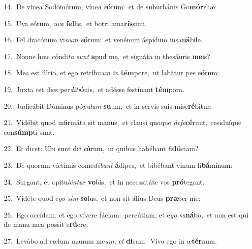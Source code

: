 {\numbfont\textcolor{\numbcolor}{14.}}~De vínea Sodomórum, víne\textit{a} \textit{e}\-\textbf{ó}rum:~\star et de suburbánis Go\-\textbf{mór}\-rhæ:\par
{\numbfont\textcolor{\numbcolor}{15.}}~Uva eórum, \textit{u}\-\textit{va} \textbf{fel}\-lis,~\star et botri ama\-\textbf{rís}\-simi.\par
{\numbfont\textcolor{\numbcolor}{16.}}~Fel dracónum vi\textit{num} \textit{e}\-\textbf{ó}rum:~\star et venénum áspidum insa\-\textbf{ná}\-bile.\par
{\numbfont\textcolor{\numbcolor}{17.}}~Nonne hæc cóndi\textit{ta} \textit{sunt} \textbf{a}\-pud me,~\star et signáta in thesáuris \textbf{me}\-is?\par
{\numbfont\textcolor{\numbcolor}{18.}}~Mea est últio, et ego retríbu\textit{am} \textit{in} \textbf{tém}\-pore,~\star ut labátur pes e\-\textbf{ó}\-rum:\par
{\numbfont\textcolor{\numbcolor}{19.}}~Juxta est dies per\-\textit{di}\-\textit{ti}\textbf{ó}nis,~\star et adésse festínant \textbf{tém}\-pora.\par
{\numbfont\textcolor{\numbcolor}{20.}}~Judicábit Dóminus pó\-\textit{pu}\-\textit{lum} \textbf{su}\-um,~\star et in servis suis mise\-\textbf{ré}\-bitur:\par
{\numbfont\textcolor{\numbcolor}{21.}}~Vidébit quod infirmáta sit manus,~\dagger et clausi quoque \textit{de}\-\textit{fe}\textbf{cé}runt,~\star residuíque con\-\textbf{súmp}\-ti sunt.\par
{\numbfont\textcolor{\numbcolor}{22.}}~Et dicet: Ubi sunt di\textit{i} \textit{e}\-\textbf{ó}rum,~\star in quibus habébant fi\-\textbf{dú}\-ciam?\par
{\numbfont\textcolor{\numbcolor}{23.}}~De quorum víctimis come\-\textit{dé}\-\textit{bant} \textbf{á}\-dipes,~\star et bibébant vinum li\-\textbf{bá}\-minum:\par
{\numbfont\textcolor{\numbcolor}{24.}}~Surgant, et opitu\-\textit{lén}\-\textit{tur} \textbf{vo}\-bis,~\star et in necessitáte vos \textbf{pró}\-tegant.\par
{\numbfont\textcolor{\numbcolor}{25.}}~Vidéte quod e\textit{go} \textit{sim} \textbf{so}\-lus,~\star et non sit álius Deus \textbf{præ}\-ter me:\par
{\numbfont\textcolor{\numbcolor}{26.}}~Ego occídam, et ego vívere fáciam:~\dagger percútiam, et e\textit{go} \textit{sa}\-\textbf{ná}bo,~\star et non est qui de manu mea possit e\-\textbf{rú}\-ere.\par
{\numbfont\textcolor{\numbcolor}{27.}}~Levábo ad cælum manum me\-\textit{am}\-, \textit{et} \textbf{di}\-cam:~\star Vivo ego in æ\-\textbf{tér}\-num.\par
